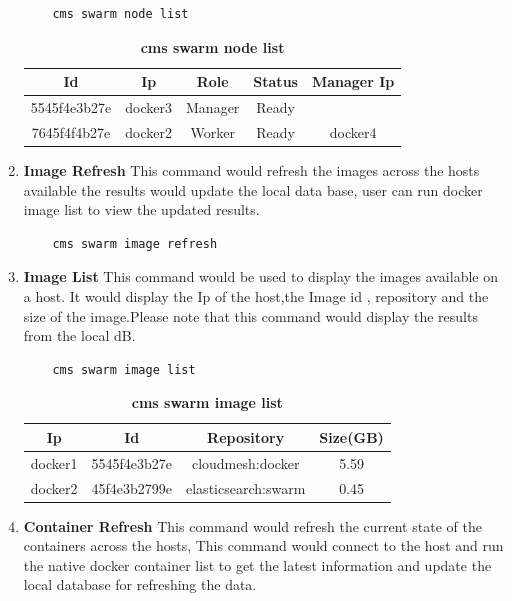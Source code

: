 \documentclass[9pt,twocolumn,twoside]{../../styles/osajnl}
\begin{document}
\begin{enumerate}
    \begin{verbatim}
    cms swarm node list
    \end{verbatim} 

     \begin{table}[htbp]
     \caption{\bf cms swarm node list }
     \begin{tabular}{ccccc}
     \hline
      Id & Ip & Role &Status & Manager Ip\\
      \hline
      5545f4e3b27e &docker3& Manager&Ready&  \\
      7645f4f4b27e &docker2& Worker&Ready&docker4  \\
     \hline
     \end{tabular}
     \label{tab:tab8}
     \end{table}
     
    \item \textbf{Image Refresh}
    This command would refresh the images across the hosts available the results would update the local data base, user can run docker image list to view the updated results.
    
    \begin{verbatim}
    cms swarm image refresh
    \end{verbatim} 
     
    \item \textbf{Image List}
    This command would be used to display the images available on a host.
    It would display the Ip of the host,the Image id , repository and the size of the image.Please note that this command would display the results from the local dB.
    
    \begin{verbatim}
    cms swarm image list
    \end{verbatim} 
    
    \begin{table}[htbp]
     \caption{\bf cms swarm image list }
     \begin{tabular}{cccc}
     \hline
      Ip & Id & Repository & Size(GB)\\
      \hline
      docker1 & 5545f4e3b27e & cloudmesh:docker & 5.59 \\
      docker2 & 45f4e3b2799e & elasticsearch:swarm & 0.45 \\
     \hline
     \end{tabular}
     \label{tab:tab9}
     \end{table}
     
    \item \textbf{Container Refresh}
    This command would refresh the current state of the containers across the hosts, This command would connect to the host and run the native docker container list to get the latest information and update the local database for refreshing the data. 
    

\end{enumerate}
\end{document}
